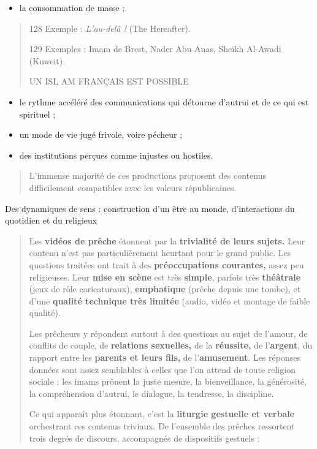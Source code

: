 \begin{itemize}
\item
  la consommation de masse ;
\end{itemize}

\begin{quote}
128 Exemple : \emph{L'au-delà !} (The Hereafter).

129 Exemples : Imam de Brest, Nader Abu Anas, Sheikh Al-Awadi (Kuweit).

UN ISL AM FRANÇAIS EST POSSIBLE
\end{quote}

\begin{itemize}
\item
  le rythme accéléré des communications qui détourne d'autrui et de ce
  qui est spirituel ;
\item
  un mode de vie jugé frivole, voire pécheur ;
\item
  des institutions perçues comme injustes ou hostiles.
\end{itemize}

\begin{quote}
L'immense majorité de ces productions proposent des contenus
difficilement compatibles avec les valeurs républicaines.
\end{quote}

Des dynamiques de sens : construction d'un être au monde, d'interactions
du quotidien et du religieux

\begin{quote}
Les \textbf{vidéos de prêche} étonnent par la \textbf{trivialité de
leurs sujets.} Leur contenu n'est pas particulièrement heurtant pour le
grand public. Les questions traitées ont trait à des
\textbf{préoccupations courantes,} assez peu religieuses. Leur
\textbf{mise en scène} est très \textbf{simple}, parfois très
\textbf{théâtrale} (jeux de rôle caricaturaux), \textbf{emphatique}
(prêche depuis une tombe), et d'une \textbf{qualité technique très
limitée} (audio, vidéo et montage de faible qualité).

Les prêcheurs y répondent surtout à des questions au sujet de l'amour,
de conflits de couple, de \textbf{relations sexuelles,} de la
\textbf{réussite,} de l'\textbf{argent}, du rapport entre les
\textbf{parents et leurs fils,} de l'\textbf{amusement}. Les réponses
données sont assez semblables à celles que l'on attend de toute religion
sociale : les imams prônent la juste mesure, la bienveillance, la
générosité, la compréhension d'autrui, le dialogue, la tendresse, la
discipline.

Ce qui apparaît plus étonnant, c'est la \textbf{liturgie gestuelle et
verbale} orchestrant ces contenus triviaux. De l'ensemble des prêches
ressortent trois degrés de discours, accompagnés de dispositifs gestuels
:
\end{quote}


